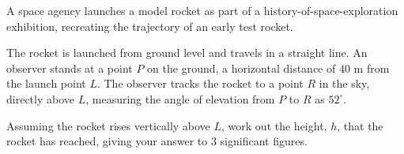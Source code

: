 \begin{question}
\noindent A space agency launches a model rocket as part of a history-of-space-exploration exhibition, recreating the trajectory of an early test rocket.

\noindent The rocket is launched from ground level and travels in a straight line. An observer stands at a point $P$ on the ground, a horizontal distance of $40$ m from the launch point $L$. The observer tracks the rocket to a point $R$ in the sky, directly above $L$, measuring the angle of elevation from $P$ to $R$ as $52^{\circ}$.

\begin{center}
\end{center}

\noindent Assuming the rocket rises vertically above $L$, work out the height, $h$, that the rocket has reached, giving your answer to 3 significant figures.
\vspace{4.5cm}
\end{question}

